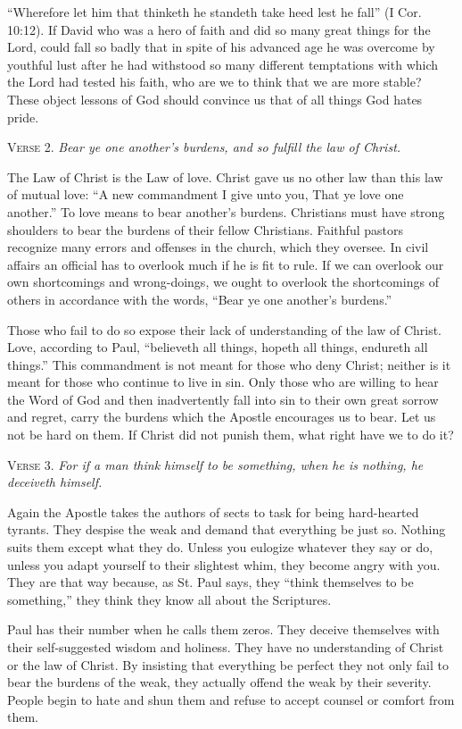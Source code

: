 “Wherefore let him that thinketh he standeth take heed lest he fall” (I Cor. 10:12). If David who was a hero of faith and did so many great things for the Lord, could fall so badly that in spite of his advanced age he was overcome by youthful lust after he had withstood so many different temptations with which the Lord had tested his faith, who are we to think that we are more stable? These object lessons of God should convince us that of all things God hates pride.

\textsc{Verse} 2. \emph{Bear ye one another’s burdens, and so fulfill the law of Christ.}

The Law of Christ is the Law of love. Christ gave us no other law than this law of mutual love: “A new commandment I give unto you, That ye love one another.” To love means to bear another’s burdens. Christians must have strong shoulders to bear the burdens of their fellow Christians. Faithful pastors recognize many errors and offenses in the church, which they oversee. In civil affairs an official has to overlook much if he is fit to rule. If we can overlook our own shortcomings and wrong-doings, we ought to overlook the shortcomings of others in accordance with the words, “Bear ye one another’s burdens.”

Those who fail to do so expose their lack of understanding of the law of Christ. Love, according to Paul, “believeth all things, hopeth all things, endureth all things.” This commandment is not meant for those who deny Christ; neither is it meant for those who continue to live in sin. Only those who are willing to hear the Word of God and then inadvertently fall into sin to their own great sorrow and regret, carry the burdens which the Apostle encourages us to bear. Let us not be hard on them. If Christ did not punish them, what right have we to do it?

\textsc{Verse} 3. \emph{For if a man think himself to be something, when he is nothing, he deceiveth himself.}

Again the Apostle takes the authors of sects to task for being hard-hearted tyrants. They despise the weak and demand that everything be just so. Nothing suits them except what they do. Unless you eulogize whatever they say or do, unless you adapt yourself to their slightest whim, they become angry with you. They are that way because, as St. Paul says, they “think themselves to be something,” they think they know all about the Scriptures.

Paul has their number when he calls them zeros. They deceive themselves with their self-suggested wisdom and holiness. They have no understanding of Christ or the law of Christ. By insisting that everything be perfect they not only fail to bear the burdens of the weak, they actually offend the weak by their severity. People begin to hate and shun them and refuse to accept counsel or comfort from them.


